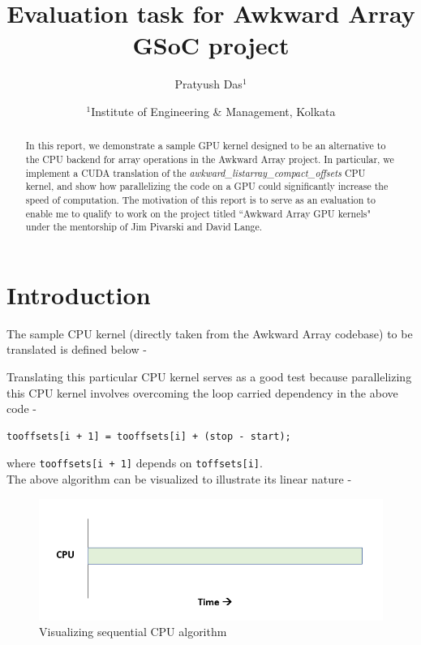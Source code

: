 \documentclass{article}
\title{Evaluation task for Awkward Array GSoC project}
\author{Pratyush Das$^1$}
\date{%
    $^1$Institute of Engineering \& Management, Kolkata\\%
}
\begin{document}

\maketitle

\begin{abstract}

    In this report, we demonstrate a sample GPU kernel designed to be an alternative to the CPU backend for array operations in the Awkward Array project. In particular, we implement a CUDA translation of the \textit{awkward\_listarray\_compact\_offsets} CPU kernel, and show how parallelizing the code on a GPU could significantly increase the speed of computation. The motivation of this report is to serve as an evaluation to enable me to qualify to work on the project titled ``Awkward Array GPU kernels" under the mentorship of Jim Pivarski and David Lange.

\end{abstract}

\section{Introduction}

The sample CPU kernel (directly taken from the Awkward Array codebase) to be translated is defined below -
\begin{mdframed}[backgroundcolor=light-gray, roundcorner=10pt,leftmargin=0.5, rightmargin=0.5, innertopmargin=1,innerbottommargin=1, outerlinewidth=1, linecolor=light-gray]

\end{mdframed}
Translating this particular CPU kernel serves as a good test because parallelizing this CPU kernel involves overcoming the loop carried dependency in the above code -
\begin{mdframed}[backgroundcolor=light-gray, roundcorner=10pt,leftmargin=0.5, rightmargin=0.5, innertopmargin=1,innerbottommargin=1, outerlinewidth=1, linecolor=light-gray]
\begin{lstlisting}
tooffsets[i + 1] = tooffsets[i] + (stop - start);
\end{lstlisting}
\end{mdframed}
where \texttt{tooffsets[i + 1]} depends on \texttt{toffsets[i]}.\\

\pagebreak
The above algorithm can be visualized to illustrate its linear nature -
\begin{figure}[H]
\includegraphics[width=\textwidth]{Graphics/cpu.PNG}
\caption{Visualizing sequential CPU algorithm}
\end{figure}
\end{document}

